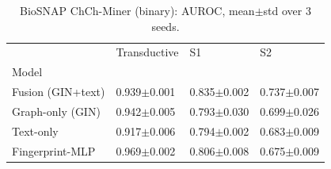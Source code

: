 \begin{table}[t]
\caption{BioSNAP ChCh-Miner (binary): AUROC, mean$\pm$std over 3 seeds.}
\label{tab:biosnap-auroc}
\begin{tabular}{llll}
\toprule
 & Transductive & S1 & S2 \\
Model &  &  &  \\
\midrule
Fusion (GIN+text) & 0.939$\pm$0.001 & 0.835$\pm$0.002 & 0.737$\pm$0.007 \\
Graph-only (GIN) & 0.942$\pm$0.005 & 0.793$\pm$0.030 & 0.699$\pm$0.026 \\
Text-only & 0.917$\pm$0.006 & 0.794$\pm$0.002 & 0.683$\pm$0.009 \\
Fingerprint-MLP & 0.969$\pm$0.002 & 0.806$\pm$0.008 & 0.675$\pm$0.009 \\
\bottomrule
\end{tabular}
\end{table}
